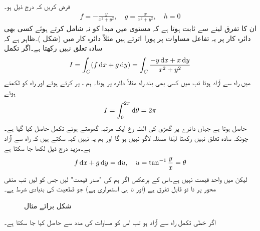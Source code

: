فرض کریں کہ درج ذیل ہو۔
\begin{align*}
f=-\frac{y}{x^2+y^2},\quad g=\frac{x}{x^2+y^2},\quad h=0
\end{align*}
ان کا تفرق لینے سے ثابت ہوتا ہے کہ  مستوی میں مبدا کو نہ شامل کرتے ہوئے کسی بھی دائرہ کار پر  یہ تفاعل مساوات  پر پورا اترتے ہیں مثلاً دائرہ کار  میں (شکل )۔ظاہر ہے کہ  سادہ تعلق نہیں رکھتا ہے۔اگر تکمل
\begin{align*}
I=\int_C (f\dif x+g\dif y)=\int_C \frac{-y\dif x+x\dif y}{x^2+y^2}
\end{align*}
 میں راہ سے آزاد ہوتا تب  میں کسی بھی بند راہ مثلاً دائرہ  پر  ہوتا۔ ہم ،  پر کرتے ہوئے  اور راہ کو  لکھتے ہوئے 
\begin{align*}
I=\int_0^{2\pi}\dif \theta=2\pi
\end{align*}
حاصل ہوتا ہے جہاں دائرے پر گھڑی کی الٹ رخ ایک مرتبہ گھومتے ہوئے تکمل حاصل کیا گیا ہے۔چونکہ  سادہ تعلق نہیں رکھتا لہٰذا  مسئلہ  لاگو نہیں ہو گا اور ہم یہ نہیں کہہ سکتے ہیں کہ  راہ سے آزاد ہے۔مزید درج ذیل لکھا جا سکتا ہے
\begin{align*}
f\dif x+g\dif y=\dif u,\quad u=\tan^{-1} \frac{y}{x}=\theta
\end{align*} 
لیکن  میں  واحد قیمت نہیں ہے۔اس کے برعکس اگر ہم  کی "صدر قیمت" لیں جس کو  لیں تب منفی  محور پر   نا تو قابل تفرق ہے (اور نا ہی استمراری ہے) جو قطعیت کی بنیادی شرط ہے۔
\begin{figure}
\centering
{}
\caption{شکل برائے مثال }
\label{شکل_مثال_خطی_تکمل_راہ_سے_آزاد_نہیں}
\end{figure}

اگر خطی تکمل راہ سے آزاد ہو تب اس کو مساوات  کی مدد سے حاصل کیا جا سکتا ہے۔

